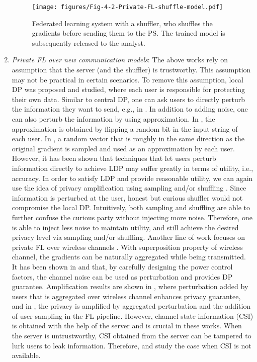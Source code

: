 \begin{enumerate}
\begin{figure}[t]
    \centering
    \texttt{[image: figures/Fig-4-2-Private-FL-shuffle-model.pdf]}
    \caption{Federated learning system with a shuffler, who shuffles the gradients before sending them to the PS. The trained model is subsequently released to the analyst.
    }
    \label{fig:FL_system_model_shuffle}
\end{figure}

\item \textit{Private FL over new communication models}:
The above works rely on assumption that the server (and the shuffler) is trustworthy. This assumption may not be practical in certain scenarios. To remove this assumption, local DP was proposed and studied, where each user is responsible for protecting their own data. Similar to central DP, one can ask users to directly perturb the information they want to send, e.g., in \cite{Ono2020LDPReinforcementLearning}. In addition to adding noise, one can also perturb the information by using approximation. In \cite{Smith2017Interaction}, the approximation is obtained by flipping a random bit in the input string of each user. In \cite{Duchi2013Local}, a random vector that is roughly in the same direction as the original gradient is sampled and used as an approximation by each user. However, it has been shown that techniques that let users perturb information directly to achieve LDP may suffer greatly in terms of utility, i.e., accuracy. In order to satisfy LDP and provide reasonable utility, we can again use the idea of privacy amplification using sampling and/or shuffling \cite{Erlingsson2019Shuffling, Balle2019Blanket, Ghazi2019Scalable, Balle2020RandomCheckIn, Girgis2021ShuffledModel}. Since information is perturbed at the user, honest but curious shuffler would not compromise the local DP. Intuitively, both sampling and shuffling are able to further confuse the curious party without injecting more noise. Therefore, one is able to inject less noise to maintain utility, and still achieve the desired privacy level via sampling and/or shuffling. Another line of work focuses on private FL over wireless channels \cite{Seif2020Wireless, Sonee2020quantizedWirelessDP, Koda2020WirelessDP, Liu2021privacyForFree, Hasircioglu2021WirelessDP, Seif2021privacyAmp}. With superposition property of wireless channel, the gradients can be naturally aggregated while being transmitted. It has been shown in \cite{Koda2020WirelessDP} and \cite{Liu2021privacyForFree} that, by carefully designing the power control factors, the channel noise can be used as perturbation and provides DP guarantee. Amplification results are shown in \cite{Seif2020Wireless}, where perturbation added by users that is aggregated over wireless channel enhances privacy guarantee, and in \cite{Seif2021privacyAmp}, the privacy is amplified by aggregated perturbation and the addition of user sampling in the FL pipeline. However, channel state information (CSI) is obtained with the help of the server and is crucial in these works. When the server is untrustworthy, CSI obtained from the server can be tampered to lurk users to leak information. Therefore, \cite{Hasircioglu2021WirelessDP} and \cite{Seif2021privacyAmp} study the case when CSI is not available.


\end{enumerate}
